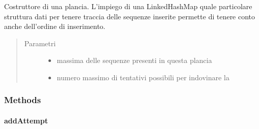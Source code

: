 \documentclass[letterpaper,10pt,italian,openany,oneside]{sphinxmanual}
\begin{document}
\begin{fulllineitems}
\label{\detokenize{source/it/unicam/cs/pa/mastermind/gamecore/BoardModel:it.unicam.cs.pa.mastermind.gamecore.BoardModel.BoardModel(int, int)}}
Costruttore di una plancia. L’impiego di una LinkedHashMap quale particolare struttura dati per tenere traccia delle sequenze inserite permette di tenere conto anche dell’ordine di inserimento.
\begin{quote}\begin{description}
\item[{Parametri}] \leavevmode\begin{itemize}
\item {} 
 \textendash{} massima delle sequenze presenti in questa plancia

\item {} 
 \textendash{} numero massimo di tentativi possibili per indovinare la 

\end{itemize}

\end{description}\end{quote}

\end{fulllineitems}



\subsubsection{Methods}
\label{\detokenize{source/it/unicam/cs/pa/mastermind/gamecore/BoardModel:methods}}

\paragraph{addAttempt}
\label{\detokenize{source/it/unicam/cs/pa/mastermind/gamecore/BoardModel:addattempt}}
\end{document}
